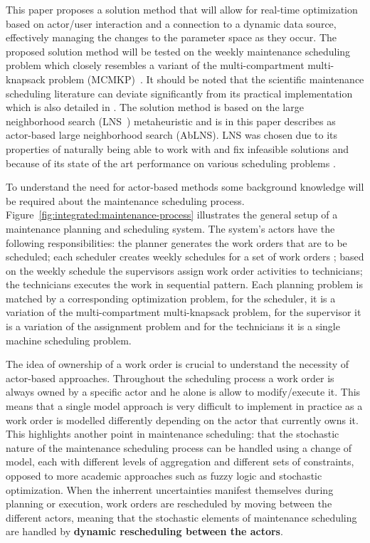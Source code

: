 This paper proposes a solution method that will allow for real-time optimization
based on actor/user interaction and a connection to a dynamic data source,
effectively managing the changes to the parameter space as they occur. The proposed solution
method will be tested on the weekly maintenance scheduling problem \citet{palmerMaintenancePlanningScheduling2019}
which closely resembles a variant of the multi-compartment multi-knapsack problem (MCMKP)~\cite{do2007constrained}. It
should be noted that the scientific maintenance scheduling literature can deviate
significantly from its practical implementation which is also detailed in
\citep{palmerMaintenancePlanningScheduling2019}. The solution method is
based on the large neighborhood search (LNS~\cite{shaw1998using}) metaheuristic and is in this
paper describes as actor-based large neighborhood search (AbLNS). LNS
was chosen due to its properties of naturally being able to work with and fix
infeasible solutions and because of its state of the art performance on various scheduling
problems \citep{gendreauHandbookMetaheuristics2019}.

To understand the need for actor-based methods some
background knowledge will be required about the maintenance scheduling process.
Figure~\ref{fig:integrated:maintenance-process} illustrates the general setup
of a maintenance planning and scheduling system. The system's actors
have the following responsibilities: the planner generates the work orders that
are to be scheduled; each scheduler creates weekly schedules for a set of work orders ; 
based on the weekly schedule the supervisors assign work order
activities to technicians; the
technicians executes the work in sequential pattern. Each planning problem is matched 
by a corresponding optimization problem, for the scheduler, it is a variation of the
multi-compartment multi-knapsack problem, for the supervisor it is a variation of the 
assignment problem and for the technicians it is a single machine scheduling problem.

The idea of ownership of a work order is crucial to understand the necessity of
actor-based approaches. Throughout the scheduling process a
work order is always owned by a specific actor and he alone is allow to modify/execute it. This
means that a single model approach is very difficult to implement in practice
as a work order is modelled differently depending on the actor that currently
owns it. This highlights another point in maintenance scheduling: that
the stochastic nature of the maintenance scheduling process can be handled using
a change of model, each with different levels of aggregation and different sets
of constraints, opposed to more academic approaches such as fuzzy logic and
stochastic optimization. When the inherrent uncertainties manifest themselves
during planning or execution, work orders are rescheduled by moving between
the different actors, meaning that the stochastic elements of maintenance
scheduling are handled by \textbf{dynamic rescheduling between the actors}.


